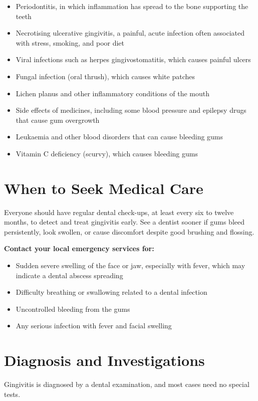 \begin{itemize}
    \item Periodontitis, in which inflammation has spread to the bone supporting the teeth
    \item Necrotising ulcerative gingivitis, a painful, acute infection often associated with stress, smoking, and poor diet
    \item Viral infections such as herpes gingivostomatitis, which causes painful ulcers
    \item Fungal infection (oral thrush), which causes white patches
    \item Lichen planus and other inflammatory conditions of the mouth
    \item Side effects of medicines, including some blood pressure and epilepsy drugs that cause gum overgrowth
    \item Leukaemia and other blood disorders that can cause bleeding gums
    \item Vitamin C deficiency (scurvy), which causes bleeding gums
\end{itemize}

\section*{When to Seek Medical Care}
Everyone should have regular dental check-ups, at least every six to twelve months, to detect and treat gingivitis early. See a dentist sooner if gums bleed persistently, look swollen, or cause discomfort despite good brushing and flossing.

\textbf{Contact your local emergency services for:}
\begin{itemize}
    \item Sudden severe swelling of the face or jaw, especially with fever, which may indicate a dental abscess spreading
    \item Difficulty breathing or swallowing related to a dental infection
    \item Uncontrolled bleeding from the gums
    \item Any serious infection with fever and facial swelling
\end{itemize}

\section*{Diagnosis and Investigations}
Gingivitis is diagnosed by a dental examination, and most cases need no special tests.

